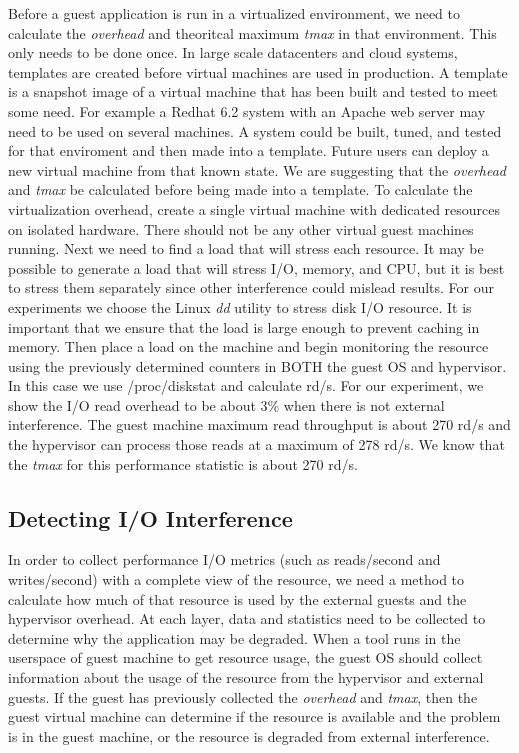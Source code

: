 \indent Before a guest application is run in a virtualized environment, we need to calculate the \emph{overhead} and theoritcal maximum \emph{tmax} in that environment.  This only needs to be done once.  In large scale datacenters and cloud systems, templates are created before virtual machines are used in production.  A template is a snapshot image of a virtual machine that has been built and tested to meet some need.  For example a Redhat 6.2 system with an Apache web server may need to be used on several machines.  A system could be built, tuned, and tested for that enviroment and then made into a template.  Future users can deploy a new virtual machine from that known state.  We are suggesting that the \emph{overhead} and \emph{tmax} be calculated before being made into a template.  
\newline
\indent To calculate the virtualization overhead, create a single virtual machine with dedicated resources on isolated hardware.  There should not be any other virtual guest machines running.  Next we need to find a load that will stress each resource.  It may be possible to generate a load that will stress I/O, memory, and CPU, but it is best to stress them separately since other interference could mislead results.  For our experiments we choose the Linux \emph{dd} utility to stress disk I/O resource.  It is important that we ensure that the load is large enough to prevent caching in memory.  Then place a load on the machine and begin monitoring the resource using the previously determined counters in BOTH the guest OS and hypervisor.  In this case we use /proc/diskstat and calculate rd/s.  For our experiment, we show the I/O read overhead to be about 3\% when there is not external interference.  The guest machine maximum read throughput is about 270 rd/s and the hypervisor can process those reads at a maximum of 278 rd/s.  We know that the \emph{tmax} for this performance statistic is about 270 rd/s.

\subsection{Detecting I/O Interference}
In order to collect performance I/O metrics (such as reads/second and writes/second) with a complete view of the resource, we need a method to calculate how much of that resource is used by the external guests and the hypervisor overhead.  At each layer, data and statistics need to be collected to determine why the application may be degraded.
\indent When a tool runs in the userspace of guest machine to get resource usage, the guest OS should collect information about the usage of the resource from the hypervisor and external guests.  If the guest has previously collected the  \emph{overhead} and \emph{tmax}, then the guest virtual machine can determine if the resource is available and the problem is in the guest machine, or the resource is degraded from external interference.

